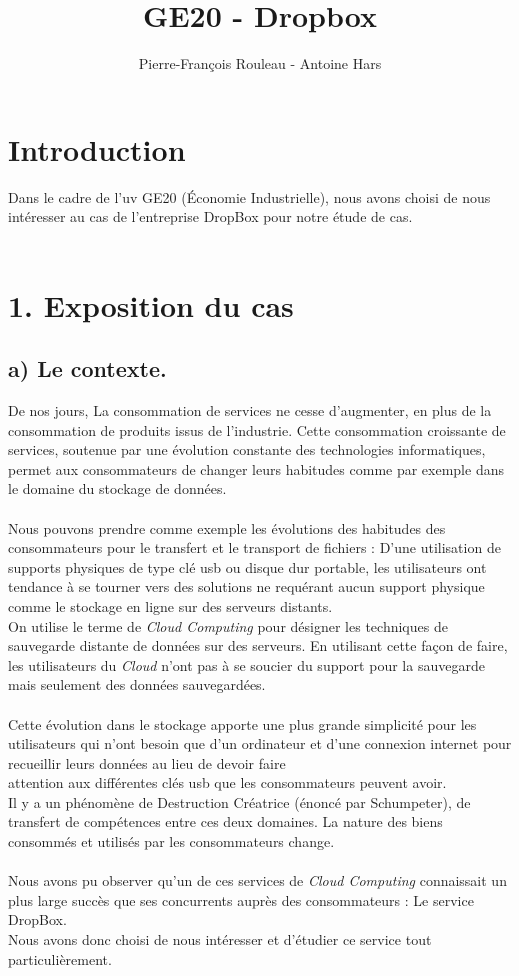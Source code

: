 \documentclass[a4paper, 10pt]{article}
\title{GE20 - Dropbox}
\author{Pierre-François Rouleau - Antoine Hars}
\begin{document}
\maketitle

\section*{Introduction}
Dans le cadre de l'uv GE20 (Économie Industrielle),
nous avons choisi de nous intéresser au cas de l'entreprise DropBox pour notre étude de cas.\\ \\

\section*{1. Exposition du cas}

\subsection*{a) Le contexte.}
De nos jours, La consommation de services ne cesse d'augmenter, en plus de la consommation de produits issus de l'industrie.
Cette consommation croissante de services, soutenue par une évolution constante des technologies informatiques, permet aux consommateurs
de changer leurs habitudes comme par exemple dans le domaine du stockage de données.\\ \\
Nous pouvons prendre comme exemple les évolutions des habitudes des consommateurs pour le transfert et le transport de fichiers :
D'une utilisation de supports physiques de type clé usb ou disque dur portable, les utilisateurs ont tendance à se tourner vers des solutions
ne requérant aucun support physique comme le stockage en ligne sur des serveurs distants.\\
On utilise le terme de \textit{Cloud Computing} pour désigner les techniques de sauvegarde distante de données sur des serveurs.
En utilisant cette façon de faire, les utilisateurs du \textit{Cloud} n'ont pas à se soucier du support pour la sauvegarde mais
seulement des donn\'ees sauvegardées.\\ \\
Cette évolution dans le stockage apporte une plus grande simplicité pour les utilisateurs
qui n'ont besoin que d'un ordinateur et d'une connexion internet pour recueillir leurs données
au lieu de devoir faire\\attention aux différentes clés usb que les consommateurs peuvent avoir.\\
Il y a un phénomène de Destruction Créatrice (énoncé par Schumpeter), de transfert de compétences entre ces deux domaines.
La nature des biens consommés et utilisés par les consommateurs change.\\ \\
Nous avons pu observer qu'un de ces services de \textit{Cloud Computing} connaissait un plus large succès
que ses concurrents auprès des consommateurs : Le service DropBox.\\
Nous avons donc choisi de nous intéresser et d'étudier ce service tout particulièrement.\\ \\
\end{document}
